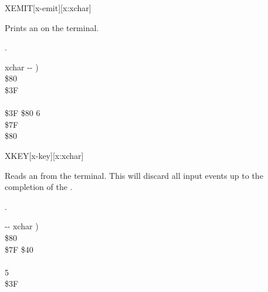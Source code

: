 \begin{worddef*}{}{XEMIT}[x-emit][x:xchar]
\item {}

	Prints an  on the terminal.

\see {}.

	\begin{implement}
	\word{:}   xchar -{}- ) \\
	\tab {} \$80        \\
	  \$3F \\
	\tab {}    \\
	\tab[2]    \$3F  \$80   6   \\
	\tab {} \$7F    \\
	\tab {}  \$80      \\
	\word{;}
	\end{implement}
\end{worddef*}


\begin{worddef*}{}{XKEY}[x-key][x:xchar]
\item {}

	Reads an  from the terminal.  This will discard all input
	events up to the completion of the \param{xchar}.

\see {}.

	\begin{implement}
	\word{:}   -{}- xchar ) \\
	\tab {}  \$80       \\
	\tab \$7F  \$40  \\
	\tab {}       \\
	   5     \\
	\tab[2] \$3F    \\
	\tab {}   \word{;}
	\end{implement}
\end{worddef*}


